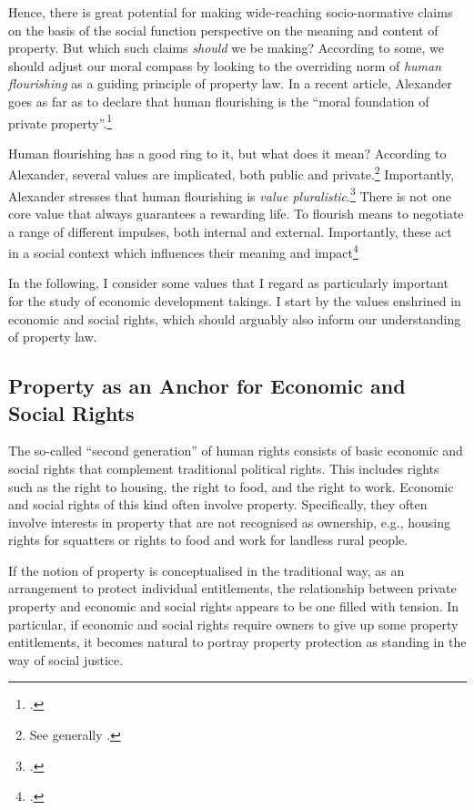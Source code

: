 Hence, there is great potential for making wide-reaching socio-normative claims on the basis of the social function perspective on the meaning and content of property. But which such claims {\it should} we be making? According to some, we should adjust our moral compass by looking to the overriding norm of {\it human flourishing} as a guiding principle of property law. In a recent article, Alexander goes as far as to declare that human flourishing is the ``moral foundation of private property''.\footcite[1261]{alexander14} 

Human flourishing has a good ring to it, but what does it mean? According to Alexander, several values are implicated, both public and private.\footnote{See generally \cite{alexander14,alexander11}.} Importantly, Alexander stresses that human flourishing is {\it value pluralistic}.\footnote{\cite[750-751]{alexander09}.} There is not one core value that always guarantees a rewarding life. To flourish means to negotiate a range of different impulses, both internal and external. Importantly, these act in a social context which influences their meaning and impact\footcite[1035-1052]{alexander11}

In the following, I consider some values that I regard as particularly important for the study of economic development takings. I start by the values enshrined in economic and social rights, which should arguably also inform our understanding of property law.

\subsection{Property as an Anchor for Economic and Social Rights}

The so-called ``second generation'' of human rights consists of basic economic and social rights that complement traditional political rights. This includes rights such as the right to housing, the right to food, and the right to work. Economic and social rights of this kind often involve property. Specifically, they often involve interests in property that are not recognised as ownership, e.g., housing rights for squatters or rights to food and work for landless rural people. 

If the notion of property is conceptualised in the traditional way, as an arrangement to protect individual entitlements, the relationship between private property and economic and social rights appears to be one filled with tension. In particular, if economic and social rights require owners to give up some property entitlements, it becomes natural to portray property protection as standing in the way of social justice. 

